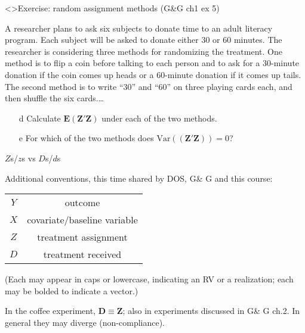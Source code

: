 \begin{frame}<\nottheirhandout>{Exercise: random assignment methods}
{\footnotesize (G\&G ch1 ex 5)}

A researcher plans to ask six subjects to donate time to an adult
literacy program. Each subject will be asked to donate either 30 or 60
minutes. The researcher is considering three methods for randomizing
the treatment. One method is to flip a coin before talking to each
person and to ask for a 30-minute donation if the coin comes up heads
or a 60-minute donation if it comes up tails. The second method is to
write ``30'' and ``60'' on three playing cards each, and then shuffle
the six cards.\ldots

\begin{itemize}
\item[d] Calculate $\mathbf{E}(\mathbf{Z}'\mathbf{Z})$ under each of the two methods.
\item[e] For which of the two methods does $\mathrm{Var}((\mathbf{Z}'\mathbf{Z})) = 0$?
\end{itemize}
\end{frame}


\begin{frame}{$Z$s/$z$s vs $D$s/$d$s}
  
Additional conventions, this time shared by DOS, G\& G and this course:

\begin{tabular}{cc}
  $Y$ & outcome \\
  $X$ & covariate/baseline variable\\
  $Z$ & treatment assignment\\
  $D$ & treatment received \\
\end{tabular}
\pause

(Each may appear in caps or lowercase, indicating an RV or a realization; each may be bolded to indicate a vector.) \pause

In the coffee experiment, $\mathbf{D} \equiv \mathbf{Z}$; also in experiments discussed in G\& G ch.2.  In general they may diverge (non-compliance). 

\end{frame}

